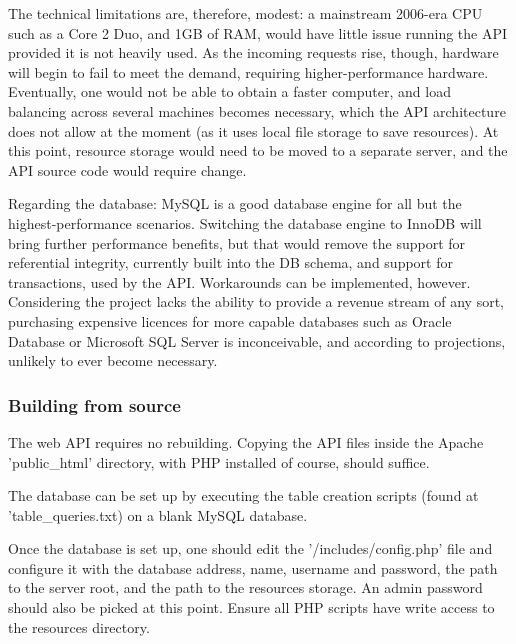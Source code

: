 	The technical limitations are, therefore, modest: a mainstream 2006-era CPU
	such as a Core 2 Duo, and 1GB of RAM, would have little issue running the
	API provided it is not heavily used. As the incoming requests rise, though,
	hardware will begin to fail to meet the demand, requiring higher-performance
	hardware. Eventually, one would not be able to obtain a faster computer, 
	and load balancing across several machines becomes necessary, which the API 
	architecture does not allow at the moment (as it uses local file storage
	to save resources). At this point, resource storage would need to be moved 
	to a separate server, and the API source code would require change. 
	
	Regarding the database: MySQL is a good database engine for all but the
	highest-performance scenarios. Switching the database engine to InnoDB will
	bring further performance benefits, but that would remove the support for 
	referential integrity, currently built into the DB schema, and support for
	transactions, used by the API. Workarounds can be implemented, however.
	Considering the project lacks the ability to provide a revenue stream
	of any sort, purchasing expensive licences for more capable databases such
	as Oracle Database or Microsoft SQL Server is inconceivable, and according
	to projections, unlikely to ever become necessary.

    \subsubsection{Building from source}
	The web API requires no rebuilding. Copying the API files inside the Apache
	'public_html' directory, with PHP installed of course, should suffice.
	
	The database can be set up by executing the table creation scripts 
	(found at 'table_queries.txt) on a blank MySQL database.
	
	Once the database is set up, one should edit the '/includes/config.php' file
	and configure it with the database address, name, username and password,
	the path to the server root, and the path to the resources storage.
	An admin password should also be picked at this point. 
	Ensure all PHP scripts have write access to the resources directory.

